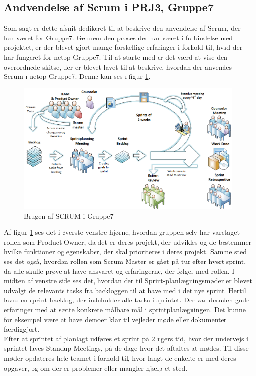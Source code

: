 \documentclass[Rapport/Rapport_main.tex]{subfiles}
\begin{document}
\subsection{Andvendelse af Scrum i PRJ3, Gruppe7}
Som sagt er dette afsnit dedikeret til at beskrive den anvendelse af Scrum, der har været for Gruppe7. Gennem den proces der har været i forbindelse med projektet, er der blevet gjort mange forskellige erfaringer i forhold til, hvad der har fungeret for netop Gruppe7. Til at starte med er det værd at vise den overordnede skitse, der er blevet lavet til at beskrive, hvordan der anvendes Scrum i netop Gruppe7. Denne kan ses i figur \ref{fig:rap_scrum_usage}.
\begin{figure}[H]
    \centering
    \includegraphics[width=\textwidth]{Processdokument/graphics/Scrum_usage.png}
    \caption{Brugen af SCRUM i Gruppe7}
    \label{fig:rap_scrum_usage}
\end{figure}
Af figur \ref{fig:rap_scrum_usage} ses det i øverste venstre hjørne, hvordan gruppen selv har varetaget rollen som Product Owner, da det er deres projekt, der udvikles og de bestemmer hvilke funktioner og egenskaber, der skal prioriteres i deres projekt. Samme sted ses det også, hvordan rollen som Scrum Master er gået på tur efter hvert sprint, da alle skulle prøve at have ansvaret og erfaringerne, der følger med rollen. I midten af venstre side ses det, hvordan der til Sprint-planlægningsmøder er blevet udvalgt de relevante tasks fra backloggen til at have med i det nye sprint. Hertil laves en sprint backlog, der indeholder alle tasks i sprintet. Der var desuden gode erfaringer med at sætte konkrete målbare mål i sprintplanlægningen. Det kunne for eksempel være at have demoer klar til vejleder møde eller dokumenter færdiggjort.\\
Efter at sprintet af planlagt udføres et sprint på 2 ugers tid, hvor der undervejs i sprintet laves Standup Meetings, på de dage hvor det aftaltes at mødes. Til disse møder opdateres hele teamet i forhold til, hvor langt de enkelte er med deres opgaver, og om der er problemer eller mangler hjælp et sted.\\
\end{document}
